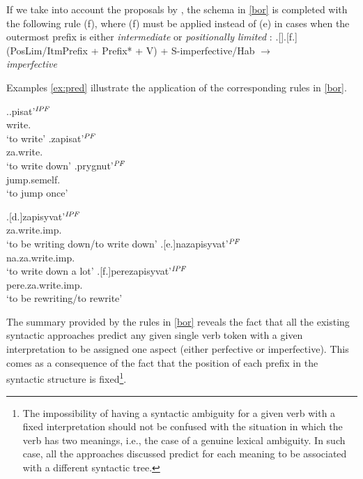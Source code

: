 If we take into account the proposals by \citet{Tatevosov:07, Tatevosov:09}, the schema in \ref{bor} is completed with the following rule (f), where (f) must be applied instead of (e) in cases when the outermost prefix is either \textit{intermediate} \citep{Tatevosov:07} or \textit{positionally limited} \citep{Tatevosov:09}: 
\ex.[]\a.[f.] (PosLim/ItmPrefix + Prefix* + V) + S-imperfective/Hab $\rightarrow$\\ \textit{imperfective} 

Examples \ref{ex:pred} illustrate the application of the corresponding rules in \ref{bor}.

\begin{minipage}{0.43\linewidth}
\vspace{0.3cm}
\ex.\label{ex:pred}\ag.\label{pred1}pisat'$^{\mathit{IPF}}$\\
write.\\
`to write'
\vspace{0.2cm}
\bg.\label{pred2}zapisat'$^{\mathit{PF}}$\\
za.write.\\
`to write down'
\vspace{0.2cm}
\bg.\label{pred3}prygnut'$^{\mathit{PF}}$\\
jump.semelf.\\
`to jump once'

\vspace{0.2cm}
\end{minipage}
\begin{minipage}{0.55\linewidth}
\vspace{0.3cm}
\exg.[d.]\label{pred4}zapisyvat'$^{\mathit{IPF}}$\\
za.write.imp.\\
`to be writing down/to write down'
\vspace{0.2cm}
\bg.[e.]\label{pred5}nazapisyvat'$^{\mathit{PF}}$\\
na.za.write.imp.\\
`to write down a lot'
\vspace{0.2cm}
\bg.[f.]\label{pred6}perezapisyvat'$^{\mathit{IPF}}$\\
pere.za.write.imp.\\
`to be rewriting/to rewrite'

\vspace{0.1cm}
\end{minipage}

The summary provided by the rules in \ref{bor} reveals the fact that all the existing syntactic approaches predict any given single verb token with a given interpretation to be assigned one aspect (either perfective or imperfective). This comes as a consequence of the fact that the position of each prefix in the syntactic structure is fixed\footnote{The impossibility of having a syntactic ambiguity for a given verb with a fixed interpretation should not be confused with the situation in which the verb has two meanings, i.e., the case of a genuine lexical ambiguity. In such case, all the approaches discussed predict for each meaning to be associated with a different syntactic tree.}. 


